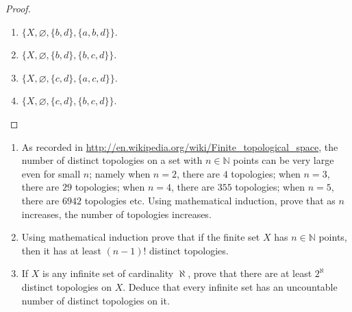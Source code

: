 \begin{proof}
\begin{enumerate}[label={(\roman*)}]
\begin{enumerate}[label={(\arabic*)}]
                  \item $\{ X, \varnothing, \{ b, d \}, \{ a, b, d \} \}$.
                  \item $\{ X, \varnothing, \{ b, d \}, \{ b, c, d \} \}$.
                  \item $\{ X, \varnothing, \{ c, d \}, \{ a, c, d \} \}$.
                  \item $\{ X, \varnothing, \{ c, d \}, \{ b, c, d \} \}$.
              \end{enumerate}
    \end{enumerate}
\end{proof}
\newpage

\begin{exercise}
    \begin{enumerate}[label={(\roman*)}]
        \item As recorded in \url{http://en.wikipedia.org/wiki/Finite_topological_space}, the number of distinct topologies on a set with $n \in \mathbb{N}$ points can be very large even for small $n$; namely when $n = 2$, there are $4$ topologies; when $n = 3$, there are $29$ topologies; when $n = 4$, there are $355$ topologies; when $n = 5$, there are $6942$ topologies etc. Using mathematical induction, prove that as $n$ increases, the number of topologies increases.
        \item Using mathematical induction prove that if the finite set $X$ has $n\in\mathbb{N}$ points, then it has at least $(n - 1){!}$ distinct topologies.
        \item If $X$ is any infinite set of cardinality $\aleph$, prove that there are at least $2^{\aleph}$ distinct topologies on $X$. Deduce that every infinite set has an uncountable number of distinct topologies on it.
    \end{enumerate}
\end{exercise}

